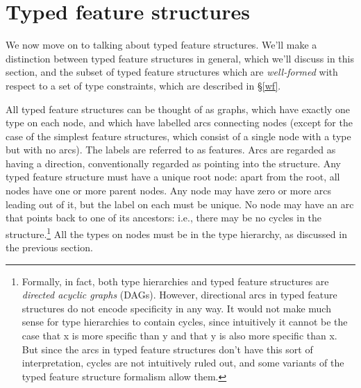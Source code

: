 \documentclass[12pt]{report}
\begin{document}
\section{Typed feature structures}

We now move on to talking about typed feature structures.
We'll make a distinction between
typed feature structures in general, which we'll discuss in this section,
and the subset of typed feature structures
which are {\it well-formed} with respect to a set of type constraints,
which are described in \S\ref{wf}.  

All typed feature structures can be thought of as graphs, which have exactly
one type on each node, and which have labelled arcs connecting nodes
(except for the case of the simplest feature structures, which
consist of a single node with a type but with no arcs). 
The labels are referred to as features.  Arcs are regarded as having
a direction, conventionally regarded as
pointing into the structure.  Any typed feature structure
must have a unique root node:  apart from the root, all nodes have
one or more parent nodes.  
Any node may have zero or more arcs leading out of it, but the
label on each must be unique.  No node may have an arc that points
back to one of its ancestors: i.e., there may be no cycles in the
structure.\footnote{Formally, in fact, both type hierarchies
and typed feature structures are {\it directed acyclic graphs} (DAGs).
However, directional arcs in typed
feature structures do not encode specificity in any way.
It would not make much sense for type hierarchies to contain cycles,
since intuitively it cannot be the case that x is more specific than
y and that y is also more specific than x.  But since the arcs in
typed feature structures don't have this sort of interpretation,
cycles are not intuitively ruled out, and some variants of the
typed feature structure formalism allow them.}
All the types on nodes must be in the type hierarchy, as discussed
in the previous section.
 
\end{document}
